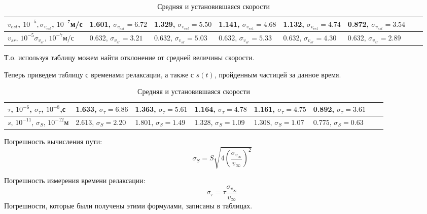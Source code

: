 \documentclass[a4paper,12pt]{article}
\begin{document}
\begin{table}[h]
    \centering
    \begin{center}
    \caption{Средняя и установившаяся скорости}
    \end{center}
    \vspace{0.1cm}
    \label{tab:my_label}
    \begin{tabular}{ |p{2.9cm}||p{2.7cm}|p{2.7cm}|p{2.7cm}|p{2.7cm}|p{2.7cm}|p{2.7cm}|p{2.7cm}| }
 \hline
    $v_{est}$, $10^{-5}, \sigma_{v_{est}}$, $10^{-7}$м/с & 1.601, $\sigma_{v_{est}} = 6.72$ & 1.329, $\sigma_{v_{est}} = 5.50$ & 1.141, $\sigma_{v_{est}} = 4.68$ & 1.132, $\sigma_{v_{est}} = 4.74$ & 0.872, $\sigma_{v_{est}} = 3.54$\\
 \hline
    $v_{sr}$, $10^{-5}\sigma_{v_{sr}}$, $10^{-7}$м/с& 0.632, $\sigma_{v_{sr}} = 3.21$ & 0.632, $\sigma_{v_{sr}} = 5.03$ & 0.632, $\sigma_{v_{sr}} = 5.33$ & 0.632, $\sigma_{v_{sr}} = 4.30$ & 0.632, $\sigma_{v_{sr}} = 2.89$ \\  
 \hline
    \end{tabular}
\end{table}

Т.о. используя таблицу можем найти отклонение от средней величины скорости.
\par Теперь приведем таблицу с временами релаксации, а также с $s(t)$, пройденным частицей за данное время.
\begin{table}[h]
    \centering
    \begin{center}
    \caption{Средняя и установившаяся скорости}
    \end{center}
    \vspace{0.1cm}
    \label{tab:my_label}
    \begin{tabular}{ |p{2.7cm}||p{2.7cm}|p{2.7cm}|p{2.7cm}|p{2.7cm}|p{2.7cm}|p{2.7cm}|p{2.7cm}| }
 \hline
    $\tau$, $10^{-6}$, $\sigma_{\tau}$, $10^{-8}$,с & 1.633, $\sigma_{\tau} = 6.86$ & 1.363, $\sigma_{\tau} = 5.61$ & 1.164, $\sigma_{\tau} = 4.78$ & 1.161, $\sigma_{\tau} = 4.75$ &  0.892, $\sigma_{\tau} = 3.61$ \\
 \hline
    $s$, $10^{-11}$, $\sigma_{S}$, $10^{-12}$м & 2.613, $\sigma_{S} = 2.20$ & 1.801, $\sigma_{S} = 1.49$ & 1.328, $\sigma_{S} = 1.09$ & 1.308, $\sigma_{S} = 1.07$ & 0.775, $\sigma_{S} = 0.63$ \\  
 \hline
    \end{tabular}
\end{table}
\par Погрешность вычисления пути:
\begin{equation}
\sigma_{S} = S\sqrt{4(\frac{\sigma_{v_{\infty}}}{v_{\infty}})^{2}}
\end{equation}
\par Погрешность измерения времени релаксации:
\begin{equation}
\sigma_{\tau} = \tau \frac{\sigma_{v_{\infty}}}{v_{\infty}}
\end{equation}
Погрешности, которые были получены этими формулами, записаны в таблицах.
\end{document}
